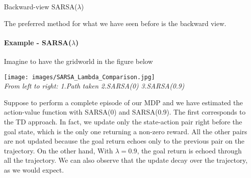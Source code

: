 \documentclass[../main.tex]{subfiles}
\begin{document}
\begin{algorithm}[H]
    \SetAlgoLined

    \caption{Backward-view SARSA($\lambda$)}
\end{algorithm}
The preferred method for what we have seen before is the backward view.

\paragraph{Example - SARSA($\lambda$)} Imagine to have the gridworld in the figure below
\begin{center}
    \texttt{[image: images/SARSA\_Lambda\_Comparison.jpg]} \\
    \textit{From left to right: 1.Path taken 2.SARSA(0) 3.SARSA(0.9)}
\end{center}
Suppose to perform a complete episode of our MDP and we have estimated the action-value function with SARSA(0) and SARSA(0.9). The first corresponds to the TD approach. In fact, we update only the state-action pair right before the goal state, which is the only one returning a non-zero reward. All the other pairs are not updated because the goal return echoes only to the previous pair on the trajectory. On the other hand, With $\lambda=0.9$, the goal return is echoed through all the trajectory. We can also observe that the update decay over the trajectory, as we would expect.
\end{document}
